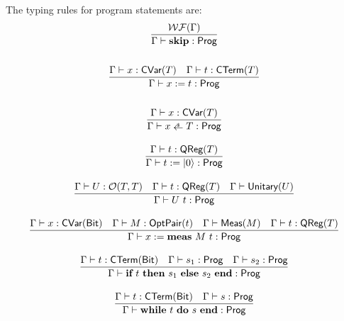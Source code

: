 The typing rules for program statements are:
\begin{gather*}
    \frac{\WF{\Gamma}}{\Gamma \vdash \Skip : \prog} \\
    \\
    \frac{\Gamma \vdash x : \cvar{T} \quad \Gamma \vdash t : \CTerm{T}}{\Gamma \vdash \Assign{x}{t} : \prog} \\
    \\
    \frac{\Gamma \vdash x : \cvar{T}}{\Gamma \vdash \pAssign{x}{T} : \prog} \\
    \\
    \frac{\Gamma \vdash t : \qreg{T}}{\Gamma \vdash \Init{t} : \prog} \\
    \\
    \frac{\Gamma \vdash U : \opt{T}{T} \quad \Gamma \vdash t : \qreg{T} \quad \Gamma \vdash \unitary{U}}{\Gamma \vdash U\ t : \prog} \\
    \\
    \frac{\Gamma \vdash x : \cvar{\bit} \quad \Gamma \vdash M : \optpair{t} \quad \Gamma \vdash \meas{M} \quad \Gamma \vdash t : \qreg{T} }{\Gamma \vdash \MeaAssign{x}{M}{t} : \prog} \\
    \\
    \frac{\Gamma \vdash t : \CTerm{\bit} \quad \Gamma \vdash s_1 : \prog \quad \Gamma \vdash s_2 : \prog}
    {\Gamma \vdash \If{t}{s_1}{s_2} : \prog} \\
    \\
    \frac{\Gamma \vdash t : \CTerm{\bit} \quad \Gamma \vdash s : \prog}
    {\Gamma \vdash \While{t}{s} : \prog}
\end{gather*}



